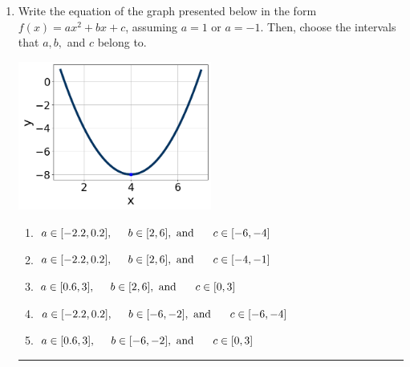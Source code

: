 \documentclass[14pt]{extbook}
\newcommand{\litem}[1]{\item#1\hspace*{-1cm}\rule{\textwidth}{0.4pt}}
\begin{document}
\begin{enumerate}
{\begin{enumerate}[label=\Alph*.]
\end{enumerate} }
\litem{
Write the equation of the graph presented below in the form $f(x)=ax^2+bx+c$, assuming  $a=1$ or $a=-1$. Then, choose the intervals that $a, b,$ and $c$ belong to.
\begin{center}
    \includegraphics[width=0.5\textwidth]{../Figures/quadraticGraphToEquationC.png}
\end{center}
\begin{enumerate}[label=\Alph*.]
\item \( a \in [-2.2, 0.2], \hspace*{5mm} b \in [2, 6], \text{ and } \hspace*{5mm} c \in [-6, -4] \)
\item \( a \in [-2.2, 0.2], \hspace*{5mm} b \in [2, 6], \text{ and } \hspace*{5mm} c \in [-4, -1] \)
\item \( a \in [0.6, 3], \hspace*{5mm} b \in [2, 6], \text{ and } \hspace*{5mm} c \in [0, 3] \)
\item \( a \in [-2.2, 0.2], \hspace*{5mm} b \in [-6, -2], \text{ and } \hspace*{5mm} c \in [-6, -4] \)
\item \( a \in [0.6, 3], \hspace*{5mm} b \in [-6, -2], \text{ and } \hspace*{5mm} c \in [0, 3] \)


\end{enumerate}}
\end{enumerate}
\end{document}
